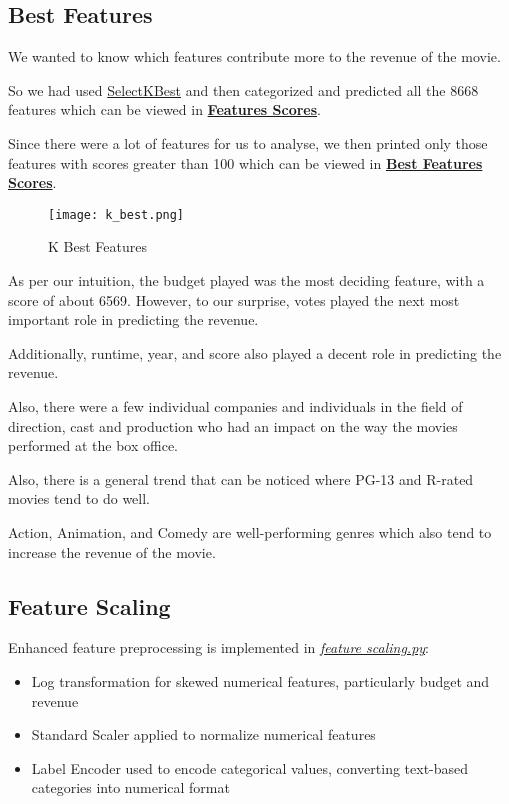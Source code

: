 \documentclass[conference]{IEEEtran}
\begin{document}
        \subsection{Best Features}
            We wanted to know which features contribute more to the revenue of the movie.

            So we had used \href{https://scikit-learn.org/stable/modules/generated/sklearn.feature_selection.SelectKBest.html}{SelectKBest} and then categorized and predicted all the 8668 features which can be viewed in \href{https://github.com/Vikranth3140/Movie-Revenue-Prediction/blob/main/Helper%20files/Best%20Festures/feature_scores.txt}{\textbf{Features Scores}}.

            Since there were a lot of features for us to analyse, we then printed only those features with scores greater than 100 which can be viewed in \href{https://github.com/Vikranth3140/Movie-Revenue-Prediction/blob/main/Helper%20files/Best%20Festures/significant_features.txt}{\textbf{Best Features Scores}}.

            \begin{figure}[h]
                \centering
                \texttt{[image: k\_best.png]}
                \caption{K Best Features}
                \label{fig:k-best}
            \end{figure}

            As per our intuition, the budget played was the most deciding feature, with a score of about 6569.
            However, to our surprise, votes played the next most important role in predicting the revenue.

            Additionally, runtime, year, and score also played a decent role in predicting the revenue.

            Also, there were a few individual companies and individuals in the field of direction, cast and production who had an impact on the way the movies performed at the box office.

            Also, there is a general trend that can be noticed where PG-13 and R-rated movies tend to do well.

            Action, Animation, and Comedy are well-performing genres which also tend to increase the revenue of the movie.

    \subsection{Feature Scaling}
        Enhanced feature preprocessing is implemented in \href{https://github.com/Vikranth3140/Movie-Revenue-Prediction/blob/main/models/feature_scaling.py}{\textit{feature scaling.py}}:
        \begin{itemize}
            \item Log transformation for skewed numerical features, particularly budget and revenue
            \item Standard Scaler applied to normalize numerical features
            \item Label Encoder used to encode categorical values, converting text-based categories into numerical format
        \end{itemize}
\end{document}
